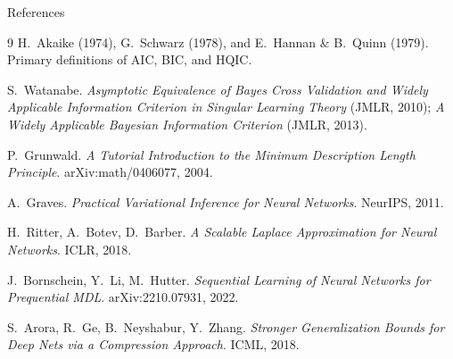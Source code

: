 \documentclass[aspectratio=169,notheorems]{beamer}
\begin{document}
\begin{frame}[t,shrink=5]{References}
\scriptsize
\begin{thebibliography}{9}\setlength{\itemsep}{0.28em}
H.~Akaike (1974), G.~Schwarz (1978), and E.~Hannan \& B.~Quinn (1979).
Primary definitions of AIC, BIC, and HQIC.

S.~Watanabe. \emph{Asymptotic Equivalence of Bayes Cross Validation and Widely
Applicable Information Criterion in Singular Learning Theory} (JMLR, 2010);
\emph{A Widely Applicable Bayesian Information Criterion} (JMLR, 2013).

P.~Grunwald. \emph{A Tutorial Introduction to the Minimum Description Length Principle}.
arXiv:math/0406077, 2004.

A.~Graves. \emph{Practical Variational Inference for Neural Networks}. NeurIPS, 2011.

H.~Ritter, A.~Botev, D.~Barber. \emph{A Scalable Laplace Approximation for Neural Networks}.
ICLR, 2018.

J.~Bornschein, Y.~Li, M.~Hutter. \emph{Sequential Learning of Neural Networks for
Prequential MDL}. arXiv:2210.07931, 2022.

S.~Arora, R.~Ge, B.~Neyshabur, Y.~Zhang. \emph{Stronger Generalization Bounds for Deep
Nets via a Compression Approach}. ICML, 2018.
\end{thebibliography}
\end{frame}
\end{document}
